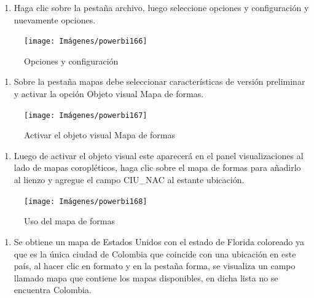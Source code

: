 \documentclass[
]{book}
\providecommand{\tightlist}{%
  \setlength{\itemsep}{0pt}\setlength{\parskip}{0pt}}
\begin{document}
\begin{enumerate}
\def\labelenumi{\arabic{enumi}.}
\tightlist
\item
  Haga clic sobre la pestaña archivo, luego seleccione opciones y configuración y nuevamente opciones.
\end{enumerate}

\begin{figure}

{\centering \texttt{[image: Imágenes/powerbi166]} 

}

\caption{Opciones y configuración}\label{fig:paso1mapadeformas-fig}
\end{figure}

\begin{enumerate}
\def\labelenumi{\arabic{enumi}.}
\setcounter{enumi}{1}
\tightlist
\item
  Sobre la pestaña mapas debe seleccionar características de versión preliminar y activar la opción Objeto visual Mapa de formas.
\end{enumerate}

\begin{figure}

{\centering \texttt{[image: Imágenes/powerbi167]} 

}

\caption{Activar el objeto visual Mapa de formas}\label{fig:paso2mapadeformas-fig}
\end{figure}

\begin{enumerate}
\def\labelenumi{\arabic{enumi}.}
\setcounter{enumi}{2}
\tightlist
\item
  Luego de activar el objeto visual este aparecerá en el panel visualizaciones al lado de mapas coropléticos, haga clic sobre el mapa de formas para añadirlo al lienzo y agregue el campo CIU\_NAC al estante ubicación.
\end{enumerate}

\begin{figure}

{\centering \texttt{[image: Imágenes/powerbi168]} 

}

\caption{Uso del mapa de formas}\label{fig:paso3mapadeformas-fig}
\end{figure}

\begin{enumerate}
\def\labelenumi{\arabic{enumi}.}
\setcounter{enumi}{3}
\tightlist
\item
  Se obtiene un mapa de Estados Unidos con el estado de Florida coloreado ya que es la única ciudad de Colombia que coincide con una ubicación en este país, al hacer clic en formato y en la pestaña forma, se visualiza un campo llamado mapa que contiene los mapas disponibles, en dicha lista no se encuentra Colombia.
\end{enumerate}
\end{document}
